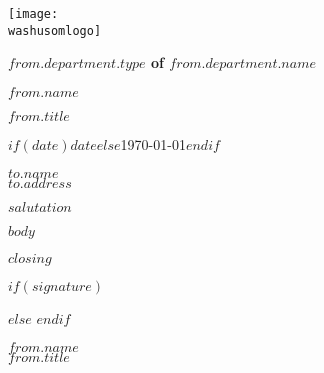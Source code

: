 \documentclass{article}
\begin{document}
\texttt{[image: \\washusomlogo]} \bigskip

\hspace{0.4in}\textbf{$from.department.type$ of $from.department.name$} \bigskip

\hspace{0.4in}\textbf{$from.name$} \par
\hspace{0.4in}\emph{$from.title$} \vspace{4\baselineskip}

$if(date)$$date$$else$\today$endif$ \vspace{3\baselineskip}

$to.name$ \\
$to.address$ \bigskip

$salutation$ \bigskip

$body$ \bigskip

$closing$

\vspace{1\baselineskip}

$if(signature)$
 \par
$else$
\vspace{1\baselineskip}
$endif$

\vspace{1\baselineskip}

$from.name$ \\
$from.title$
\end{document}
